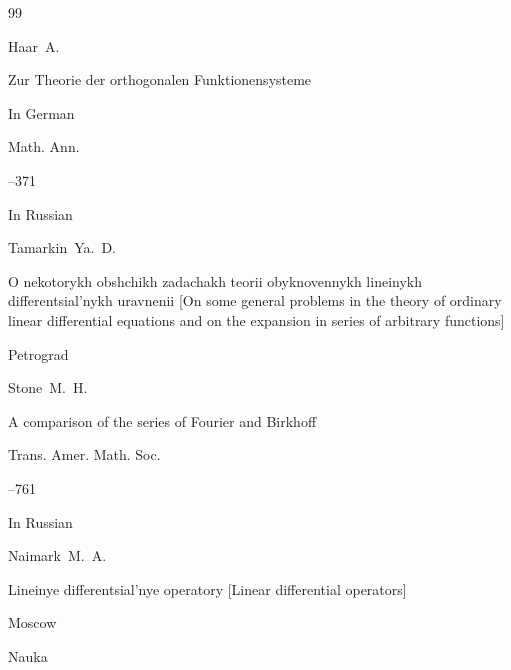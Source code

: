 \begin{thebibliography}{99}

\by Haar~A.

\paper Zur Theorie der orthogonalen Funktionensysteme

\lang In German

\jour Math. Ann. 



--371 







\lang In Russian

\by Tamarkin~Ya.~D.

\book O nekotorykh obshchikh zadachakh teorii obyknovennykh lineinykh differentsial'nykh uravnenii \rm [On some general problems in the theory of ordinary linear differential equations and on the expansion in series of arbitrary functions]

\publaddr Petrograd









\by  Stone~M.~H.

\paper  A comparison of the series of Fourier and Birkhoff

\jour Trans. Amer. Math. Soc.




--761







\lang In Russian

\by Naimark~M.~A.

\book Lineinye differentsial'nye operatory \rm [Linear differential operators]

\publaddr Moscow

\publ  Nauka










\end{thebibliography}
